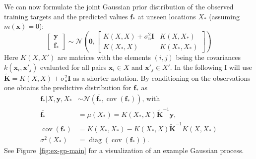 \documentclass[11pt,a4paper,twoside,BCOR=15mm]{scrreprt}
\newcommand{\vc}[1]{\bm{#1}}
\newcommand{\mat}[1]{\bm{#1}}
\DeclareMathOperator{\cov}{cov}
\DeclareMathOperator{\diag}{diag}
\newcommand{\ped}[1]{_{\mathrm{#1}}}
\begin{document}
We can now formulate the joint Gaussian prior distribution of the observed 
training targets and the predicted values $\vc f_*$ at unseen locations $X_*$ 
(assuming $m(\vc x) = 0$):
\begin{equation}
    \left[ \begin{array}{c}\vc y \\ \vc f_* \end{array} \right]
    \sim \mathcal{N}\left(\vc 0,
        \left[ \begin{array}{cc}
            K(X, X) + \sigma\ped{n}^2 \mat I & K(X, X_*) \\ K(X_*, X) & K(X_*, 
            X_*)
        \end{array} \right]
    \right)
\end{equation}
Here $K(X, X')$ are matrices with the elements $(i, j)$ being the covariances 
$k(\vc x_i, \vc x'_j)$ evaluated for all pairs $\vc x_i \in X$ and $\vc x'_j \in 
X'$. In the following I will use $\tilde{\mat K} = K(X, X) + \sigma\ped{n}^2 
\mat I$ as a shorter notation. By conditioning on the observations one obtains 
the predictive distribution for $\vc f_*$ as
\begin{align}
    \vc f_* | X, \vc y, X_* &\sim \mathcal{N}(\bar{\vc f_*}, \cov(\vc 
    f_*))\text{, with}\\
    \bar{\vc f_*} &= \mu(X_*) = K(X_*, X)\tilde{\mat K}^{-1} \vc y\text{,} \\
    \cov(\vc f_*) &= K(X_*, X_*) - K(X_*, X)\tilde{\mat K}^{-1}K(X, X_*) 
    \\
    \sigma^2(X_*) &= \diag(\cov(\vc f_*)) \text{.}
\end{align}
See Figure~\ref{fig:ex-gp-main} for a visualization of an example Gaussian 
process.
\end{document}
